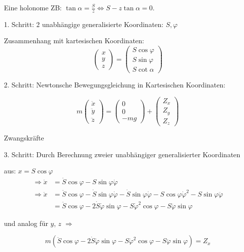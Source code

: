 \documentclass[10pt, letterpaper]{article}
\begin{document}
Eine holonome ZB: $\tan \alpha = \frac{S}{z} \Leftrightarrow S-z\tan\alpha = 0$.

1. Schritt: 2 unabhängige generalisierte Koordinaten: $S,\varphi$

Zusammenhang mit kartesischen Koordinaten:
\[
\begin{pmatrix} 
x \\ y \\ z
\end{pmatrix} = 
\begin{pmatrix}
S \cos\varphi \\ S \sin\varphi \\ S \cot\alpha
\end{pmatrix}
\]

2. Schritt: Newtonsche Bewegungsgleichung in Kartesischen Koordinaten:

\[
m\begin{pmatrix}
\ddot{x} \\ \ddot{y} \\ \ddot{z}
\end{pmatrix} = 
\begin{pmatrix}
0 \\ 0 \\ -mg
\end{pmatrix} + 
\begin{pmatrix}
Z_x \\ Z_y \\ Z_z
\end{pmatrix}
\]
\begin{flushright}
Zwangskräfte
\end{flushright}


3. Schritt: Durch Berechnung zweier unabhängiger generalisierter Koordinaten

aus: $x = S\cos\varphi$
\[\begin{aligned}
\Rightarrow \dot{x} &= \dot{S}\cos\varphi - S\sin\varphi\dot{\varphi} \\
\Rightarrow \ddot{x} &= \ddot{S}\cos\varphi - \dot{S}\sin\varphi\dot{\varphi} - \dot{S}\sin\varphi\dot{\varphi} - S\cos\varphi\dot{\varphi}^2 - S\sin\varphi\ddot{\varphi} \\
&= \ddot{S}\cos\varphi - 2\dot{S}\dot{\varphi}\sin\varphi - S\dot{\varphi}^2\cos\varphi - S\ddot{\varphi}\sin\varphi
\end{aligned}\]

und analog für $y$, $z$ $\Rightarrow$

\begin{equation}
m(\ddot{S}\cos\varphi - 2\dot{S}\dot{\varphi}\sin\varphi - S\dot{\varphi}^2\cos\varphi - S\ddot{\varphi}\sin\varphi) = Z_x \tag{1}
\end{equation}
\end{document}
